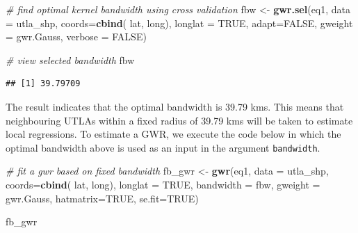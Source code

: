 \documentclass[]{book}
\newenvironment{Shaded}{\begin{snugshade}}{\end{snugshade}}
\newcommand{\KeywordTok}[1]{\textcolor[rgb]{0.13,0.29,0.53}{\textbf{#1}}}
\newcommand{\DataTypeTok}[1]{\textcolor[rgb]{0.13,0.29,0.53}{#1}}
\newcommand{\StringTok}[1]{\textcolor[rgb]{0.31,0.60,0.02}{#1}}
\newcommand{\CommentTok}[1]{\textcolor[rgb]{0.56,0.35,0.01}{\textit{#1}}}
\newcommand{\OtherTok}[1]{\textcolor[rgb]{0.56,0.35,0.01}{#1}}
\newcommand{\NormalTok}[1]{#1}
\begin{document}
\begin{Shaded}
\begin{Highlighting}[]
\CommentTok{# find optimal kernel bandwidth using cross validation}
\NormalTok{fbw <-}\StringTok{ }\KeywordTok{gwr.sel}\NormalTok{(eq1, }
               \DataTypeTok{data =}\NormalTok{ utla_shp, }
               \DataTypeTok{coords=}\KeywordTok{cbind}\NormalTok{( lat, long),}
               \DataTypeTok{longlat =} \OtherTok{TRUE}\NormalTok{,}
               \DataTypeTok{adapt=}\OtherTok{FALSE}\NormalTok{, }
               \DataTypeTok{gweight =}\NormalTok{ gwr.Gauss, }
               \DataTypeTok{verbose =} \OtherTok{FALSE}\NormalTok{)}

\CommentTok{# view selected bandwidth}
\NormalTok{fbw}
\end{Highlighting}
\end{Shaded}

\begin{verbatim}
## [1] 39.79709
\end{verbatim}

The result indicates that the optimal bandwidth is 39.79 kms. This means
that neighbouring UTLAs within a fixed radius of 39.79 kms will be taken
to estimate local regressions. To estimate a GWR, we execute the code
below in which the optimal bandwidth above is used as an input in the
argument \texttt{bandwidth}.

\begin{Shaded}
\begin{Highlighting}[]
\CommentTok{# fit a gwr based on fixed bandwidth}
\NormalTok{fb_gwr <-}\StringTok{ }\KeywordTok{gwr}\NormalTok{(eq1, }
            \DataTypeTok{data =}\NormalTok{ utla_shp,}
            \DataTypeTok{coords=}\KeywordTok{cbind}\NormalTok{( lat, long),}
            \DataTypeTok{longlat =} \OtherTok{TRUE}\NormalTok{,}
            \DataTypeTok{bandwidth =}\NormalTok{ fbw, }
            \DataTypeTok{gweight =}\NormalTok{ gwr.Gauss,}
            \DataTypeTok{hatmatrix=}\OtherTok{TRUE}\NormalTok{, }
            \DataTypeTok{se.fit=}\OtherTok{TRUE}\NormalTok{)}

\NormalTok{fb_gwr}
\end{Highlighting}
\end{Shaded}
\end{document}

